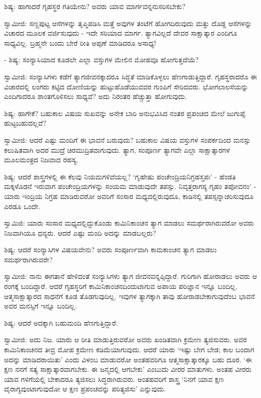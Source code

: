 ಶಿಷ್ಯ: ಹಾಗಾದರೆ ಗೃಹಸ್ಥರ ಗತಿಯೇನು? ಅವರು ಯಾವ ಮಾರ್ಗವನ್ನನುಸರಿಸಬೇಕು?

ಸ್ವಾಮೀಜಿ: ಸಣ್ಣಪುಟ್ಟ ಆಸೆಗಳನ್ನು ತೃಪ್ತಿಪಡಿಸಿ ಮತ್ತೆ ಅವುಗಳ ತಂಟೆಗೆ ಹೋಗದಿರುವುದು ಮತ್ತು ದೊಡ್ಡ ಆಸೆಗಳನ್ನು ವಿಚಾರದ ಮೂಲಕ ವರ್ಜಿಸುವುದು - ಇದೇ ಸರಿಯಾದ ಮಾರ್ಗ. ತ್ಯಾಗವಿಲ್ಲದೆ ದೇವರ ಸಾಕ್ಷಾತ್ಕಾರ ಎಂದಿಗೂ ಸಾಧ್ಯವಿಲ್ಲ. ಬ್ರಹ್ಮನೇ ಬಂದು ಬೇರೆ ರೀತಿ ಅಪ್ಪಣೆ ಮಾಡಿದರೂ ಅಸಾಧ್ಯ!

- ಶಿಷ್ಯ: ಸಂನ್ಯಾಸಿಯಾದ ಕೂಡಲೇ ಎಲ್ಲಾ ವಸ್ತುಗಳ ಮೇಲಿನ ಮೋಹವೂ ಹೋಗುತ್ತದೆಯೆ?

ಸ್ವಾಮೀಜಿ: ಸಂನ್ಯಾಸಿಗಳು ಕಡೆಗೆ ತ್ಯಾಗಜೀವನಕ್ಕಾದರೂ ಸಿದ್ಧತೆ ಮಾಡಿಕೊಳ್ಳಲು ಹೆಣಗಾಡುತ್ತಿದ್ದಾರೆ. ಗೃಹಸ್ಥರಾದರೊ ಈ ವಿಚಾರದಲ್ಲಿ ಲಂಗರು ಕಟ್ಟಿದ ದೋಣಿಯನ್ನು ಹುಟ್ಟುಹೊಡೆಯುವವರ ಗುಂಪಿಗೆ ಸೇರಿದವರು. ಭೋಗಲಾಲಸೆಯನ್ನು ಎಂದಿಗಾದರೂ ಶಾಂತಗೊಳಿಸಲು ಸಾಧ್ಯವೆ? ಅದು ನಿರಂತರ ಹೆಚ್ಚುತ್ತಾ ಹೋಗುವುದು.

ಶಿಷ್ಯ: ಹಾಗೇಕೆ? ಬಹುಕಾಲ ವಿಷಯ ಸುಖವನ್ನು ಅನೇಕ ಬಾರಿ ಅನುಭವಿಸಿದ ನಂತರ ಪ್ರಪಂಚದ ಮೇಲೆ ಜುಗುಪ್ಸೆ ಹುಟ್ಟಬಹುದಲ್ಲವೆ?

ಸ್ವಾಮೀಜಿ: ಆದರೆ ಎಷ್ಟು ಮಂದಿಗೆ ಈ ಭಾವನೆ ಬರುವುದು? ಬಹುಕಾಲ ವಿಷಯ ವಸ್ತುಗಳ ಸಂಪರ್ಕದಿಂದ ಮನಸ್ಸು ಕಲುಷಿತವಾಗಿ ಅದರ ಮುದ್ರೆ ಚಿರಮುದ್ರಿತವಾಗುವುದು. ತ್ಯಾಗ, ಸಂಪೂರ್ಣ ತ್ಯಾಗವೇ ಎಲ್ಲಾ ಸಾಕ್ಷಾತ್ಕಾರಗಳ ಮೂಲಮಂತ್ರದ ನಿಜವಾದ ರಹಸ್ಯ.

ಶಿಷ್ಯ: ಆದರೆ ಶಾಸ್ತ್ರಗಳಲ್ಲಿ ಈ ಕೆಲವು ನಿಯಮಗಳಿವೆಯಲ್ಲ? ‘ಗೃಹೇಷು ಪಂಚೇಂದ್ರಿಯನಿಗ್ರಹಸ್ತಪಃ’ - ಹೆಂಡತಿ ಮಕ್ಕಳೊಡನೆ ಇರುವಾಗ ಪಂಚೇಂದ್ರಿಯಗಳನ್ನು ಸಂಯಮ ಮಾಡುವುದೇ ತಪಸ್ಸು. ನಿವೃತ್ತರಾಗಸ್ಯ ಗೃಹಂ ತಪೋವನಂ' - ಯಾರು ಇಂದ್ರಿಯ ನಿಗ್ರಹ ಮಾಡಿರುವರೋ ಅವರಿಗೆ ಸಂಸಾರ ಮಧ್ಯದಲ್ಲಿರುವುದೂ, ಕಾಡಿನಲ್ಲಿ ತಪಸ್ಸನ್ನಾಚರಿಸುವುದೂ ಎರಡೂ ಒಂದೇ.

ಸ್ವಾಮಿಜಿ: ಯಾರು ಸಂಸಾರ ಮಧ್ಯದಲ್ಲಿದ್ದುಕೊಂಡು ಕಾಮಿನಿಕಾಂಚನ ತ್ಯಾಗ ಮಾಡಲು ಸಮರ್ಥರಾಗಿರುವರೋ ಅವರು ನಿಜವಾಗಿಯೂ ಧನ್ಯರು. ಆದರೆ ಎಷ್ಟು ಮಂದಿ ಅದನ್ನು ಮಾಡಬಲ್ಲರು?

ಶಿಷ್ಯ: ಆದರೆ ಸಂನ್ಯಾಸಿಗಳ ವಿಷಯವೇನು? ಅವರು ಸಂಪೂರ್ಣವಾಗಿ ಕಾಮಕಾಂಚನ ತ್ಯಾಗ ಮಾಡಲು ಸಮರ್ಥರಾಗಿರುವರೇ?

ಸ್ವಾಮೀಜಿ: ನಾನು ಈಗತಾನೆ ಹೇಳಿದಂತೆ ಸಂನ್ಯಾಸಿಗಳು ತ್ಯಾಗ ಜೀವನವನ್ನಪ್ಪಿದ್ದಾರೆ. ಗುರಿಗಾಗಿ ಹೋರಾಡಲು ಅವರು ಆ ರಂಗಕ್ಕೆ ಬಂದಿದ್ದಾರೆ. ಆದರೆ ಗೃಹಸ್ಥರಿಗೆ ಕಾಮಿನಿಕಾಂಚನದಿಂದುಟಾಗುವ ಅಪಾಯ ಪರಿಜ್ಞಾನ ಇನ್ನೂ ಬಂದಿಲ್ಲ. ಆತ್ಮಸಾಕ್ಷಾತ್ಕಾರದ ಸಾಧನೆಗೆ ಕೂಡ ತೊಡಗುವುದಿಲ್ಲ. ಇವುಗಳ ತ್ಯಾಗಕ್ಕಾಗಿ ತಾವು ಹೋರಾಡಬೇಕಾಗುವುದೆಂಬ ಭಾವನೆ ಅವರ ಮನಸ್ಸಿಗೆ ಇನ್ನೂ ಬಂದಿಲ್ಲ.

ಶಿಷ್ಯ: ಆದರೆ ಅದಕ್ಕಾಗಿ ಬಹುಮಂದಿ ಹೆಣಗುತ್ತಿದ್ದಾರೆ.

ಸ್ವಾಮೀಜಿ: ಅದು ನಿಜ. ಯಾರು ಆ ರೀತಿ ಮಾಡುತ್ತಿರುವರೋ ಅವರು ಖಂಡಿತವಾಗಿ ಕ್ರಮೇಣ ತ್ಯಜಿಸುವರು. ಅವರ ಕಾಮಿನಿಕಾಂಚನದ ತೀವ್ರ ಮೋಹ ಕ್ರಮೇಣ ಕಡಿಮೆಯಾಗುವುದು. ಆದರೆ ಯಾರು ‘ಇಷ್ಟು ಬೇಗ ಬೇಡ; ಕಾಲ ಬಂದಾಗ ಅದನ್ನು ಮಾಡಿದರಾಯಿತು’ ಎಂದು ವಿಳಂಬ ಮಾಡುವರೋ ಅಂತಹವರಿಗೂ ಆತ್ಮಸಾಕ್ಷಾತ್ಕಾರಕ್ಕೂ ಬಹು ದೂರ. ‘ಈ ಕ್ಷಣ ನನಗೆ ಸತ್ಯ ಸಾಕ್ಷಾತ್ಕಾರವಾಗಬೇಕು. ಈ ಜನ್ಮದಲ್ಲಿ ಆಗಬೇಕು’ ಎಂಬುದು ವೀರರ ಮಾತುಗಳು. ಅಂತಹ ವೀರರು ಯಾವ ಗಳಿಗೆಯಲ್ಲಿ ಬೇಕಾದರೂ ತ್ಯಜಿಸಲು ಸಿದ್ಧರಾಗಿರುವರು. ಅಂತಹವರಿಗೆ ಶಾಸ್ತ್ರ ‘ನಿನಗೆ ಯಾವ ಕ್ಷಣ ವೈರಾಗ್ಯವುಂಟಾಗುವುದೋ ಆ ಕ್ಷಣ ಪ್ರಪಂಚವನ್ನು ಪರಿತ್ಯಜಿಸು’ ಎನ್ನುವುದು.

